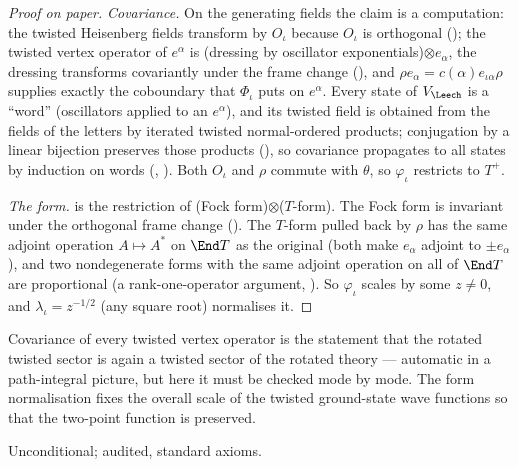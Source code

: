 \begin{proof}[Proof on paper]
\emph{Covariance.}  On the generating fields the claim is a computation: the twisted Heisenberg fields transform by
$O_\iota$ because $O_\iota$ is orthogonal (); the twisted vertex operator of $e^\alpha$ is
(dressing by oscillator exponentials)$\otimes e_\alpha$, the dressing transforms covariantly under the frame change
(), and $\rho e_\alpha=c(\alpha)e_{\iota\alpha}\rho$ supplies exactly the coboundary that
$\Phi_\iota$ puts on $e^\alpha$.  Every state of $V_\Leech$ is a ``word'' (oscillators applied to an $e^\alpha$), and its
twisted field is obtained from the fields of the letters by iterated twisted normal-ordered products; conjugation by
a linear bijection preserves those products (), so covariance propagates to all states by
induction on words (, ).  Both $O_\iota$ and $\rho$ commute
with $\theta$, so $\varphi_\iota$ restricts to $T^+$.

\emph{The form.}   is the restriction of (Fock form)$\otimes$($T$-form).  The Fock form is invariant
under the orthogonal frame change ().  The $T$-form pulled back by $\rho$ has the same
adjoint operation $A\mapsto A^*$ on $\End T$ as the original (both make $e_\alpha$ adjoint to $\pm e_\alpha$), and two
nondegenerate forms with the same adjoint operation on all of $\End T$ are proportional (a rank-one-operator argument,
).  So $\varphi_\iota$ scales  by some $z\ne0$, and $\lambda_\iota=z^{-1/2}$ (any square root)
normalises it.
\end{proof}
\begin{physics}
Covariance of every twisted vertex operator is the statement that the rotated twisted sector is again a twisted
sector of the rotated theory --- automatic in a path-integral picture, but here it must be checked mode by mode.  The
form normalisation fixes the overall scale of the twisted ground-state wave functions so that the two-point function
is preserved.
\end{physics}
\begin{status}Unconditional; audited, standard axioms.\end{status}

